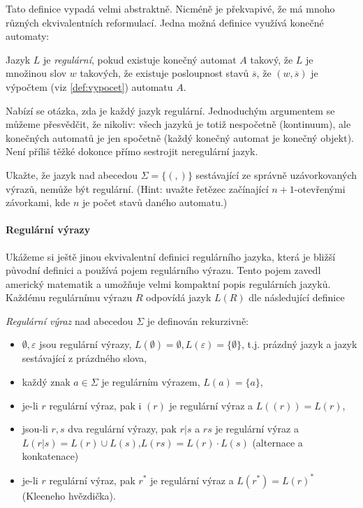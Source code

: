 Tato definice vypadá velmi abstraktně. Nicméně je překvapivé, že má mnoho různých ekvivalentních reformulací.
Jedna možná definice využívá konečné automaty:

\begin{theorem} Jazyk \(L\) je \emph{regulární}, pokud existuje konečný automat \(A\) takový, že
\(L\) je množinou slov \(w\) takových, že existuje posloupnost stavů \(\overline{s}\), že \((w,\overline{s})\) je
výpočtem (viz \ref{def:vypocet}) automatu \(A\). 
\end{theorem}

Nabízí se otázka, zda je každý jazyk regulární.  Jednoduchým argumentem se můžeme přesvědčit, že nikoliv: všech jazyků
je totiž nespočetně (kontinuum), ale konečných automatů je jen spočetně (každý konečný automat je konečný objekt).
Není příliš těžké dokonce přímo sestrojit neregulární jazyk.

\begin{cviceni} Ukažte, že jazyk nad abecedou \(\Sigma=\{(,)\}\) sestávající ze správně uzávorkovaných výrazů, nemůže
být regulární.  (Hint: uvažte řetězec začínající \(n+1\)-otevřenými závorkami, kde \(n\) je počet stavů daného automatu.)
\end{cviceni}

\paragraph{Regulární výrazy}
Ukážeme si ještě jinou ekvivalentní definici regulárního jazyka, která je bližší původní definici a používá pojem regulárního výrazu. 
Tento pojem zavedl americký matematik  a umožňuje velmi kompaktní popis regulárních jazyků. Každému regulárnímu
výrazu \(R\) odpovídá jazyk \(L(R)\) dle následující definice

\begin{definition} \emph{Regulární výraz} nad abecedou \(\Sigma\) je definován rekurzivně:
\begin{itemize}
 \item \(\emptyset, \varepsilon\) jsou regulární výrazy, \(L(\emptyset)=\emptyset, L(\varepsilon) = \{\emptyset\}\),  t.j. prázdný jazyk a jazyk sestávající z prázdného slova,
 \item každý znak \(a\in\Sigma\) je regulárním výrazem, \(L(a) = \{a\}\),
 \item je-li \(r\) regulární výraz, pak i \((r)\) je regulární výraz a \(L((r)) = L(r)\),
 \item jsou-li \(r,s\) dva regulární výrazy, pak \(r|s\) a \(rs\) je regulární výraz a \(L(r|s)=L(r)\cup L(s)\),\(L(rs)=L(r)\cdot L(s)\) (alternace a konkatenace)
 \item je-li \(r\) regulární výraz, pak \(r^*\) je regulární výraz a \(L(r^*) = L(r)^*\) (Kleeneho hvězdička).
\end{itemize}
\end{definition}

